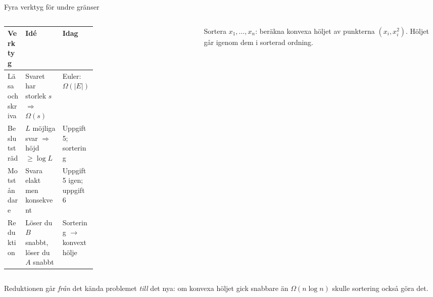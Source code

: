 \documentclass[11pt,aspectratio=169,xcolor=table,t]{beamer}
\begin{document}
\begin{frame}{Fyra verktyg för undre gränser}
\begin{columns}[T]
\begin{column}{0.68\textwidth}
\footnotesize
\renewcommand{\arraystretch}{1.35}
\begin{tabularx}{\linewidth}{@{}p{0.2\linewidth}Xp{0.27\linewidth}@{}}
\toprule
\textbf{Verktyg} & \textbf{Idé} & \textbf{Idag}\\
\midrule
Läsa och skriva & Svaret har storlek $s$ $\Rightarrow$ $\Omega(s)$ & Euler: $\Omega(|E|)$\\
Beslutsträd & $L$ möjliga svar $\Rightarrow$ höjd $\ge\log L$ & Uppgift 5; sortering\\
Motståndare & Svara elakt men konsekvent & Uppgift 5 igen; uppgift 6\\
Reduktion & Löser du $B$ snabbt, löser du $A$ snabbt & Sortering $\to$ konvext hölje\\
\bottomrule
\end{tabularx}
\end{column}
\begin{column}{0.29\textwidth}
\centering
{}\par
\scriptsize Sortera $x_1,\dots,x_n$: beräkna konvexa höljet av punkterna $(x_i,x_i^2)$. Höljet
går igenom dem i sorterad ordning.
\end{column}
\end{columns}
\vfill
\begin{ahabox}
Reduktionen går \emph{från} det kända problemet \emph{till} det nya: om konvexa höljet gick
snabbare än $\Omega(n\log n)$ skulle sortering också göra det.
\end{ahabox}
\end{frame}
\end{document}
